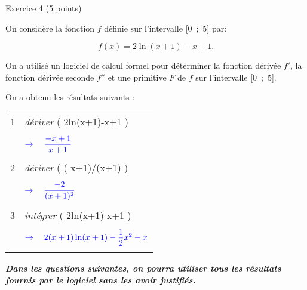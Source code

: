 
%
\begin{h2}Exercice 4 (5 points)\end{h2}
\par
On considère la fonction $f$ définie sur l'intervalle [0~;~5] par:
\par
\[ f(x) = 2\ln(x+1)-x+1. \]
\par
On a utilisé un logiciel de calcul formel pour déterminer la fonction dérivée $f'$, la fonction dérivée seconde $f''$ et une primitive $F$ de $f$ sur l'intervalle [0~;~5].
\par
On a obtenu les résultats suivants :
\par
\begin{center}
     \begin{extern}%
          \begin{tabular}{|l|l|}\hline
               1&\textit{dériver} ( 2ln(x+1)-x+1 )\\
               & \\
               &$\textcolor{blue}{\rightarrow \quad \dfrac{-x+1}{x+1}}$ \\
               & \\ \hline
               2&\textit{dériver} ( (-x+1)/(x+1) )\\
               & \\
               &$\textcolor{blue}{\rightarrow \quad \dfrac{-2}{(x+1)^2}}$ \\
               & \\ \hline
               3&\textit{intégrer} ( 2ln(x+1)-x+1 )\\
               & \\
               &$\textcolor{blue}{\rightarrow \quad 2(x+1)\ln(x+1)-\dfrac{1}{2}x^2-x}$ \\
               & \\ \hline
          \end{tabular}
     \end{extern}
\end{center}
\par
\textbf{\textit{Dans les questions suivantes, on pourra utiliser tous les résultats fournis par le logiciel sans les avoir justifiés.}}
\par
